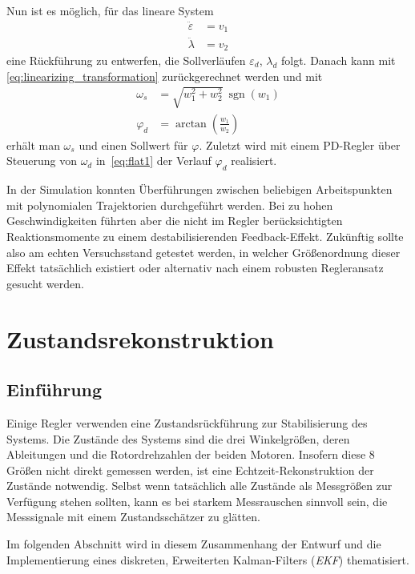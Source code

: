 \documentclass[10pt,twocolumn]{article}
\DeclareMathOperator{\sgn}{\mathrm{sgn}}
\begin{document}
	Nun ist es möglich, für das lineare System
	\begin{subequations}
		\begin{align}
		\ddot{\varepsilon} &= v_1\\
		\ddot{\lambda} &= v_2
		\end{align}
	\end{subequations}
	eine Rückführung zu entwerfen, die Sollverläufen $\varepsilon_d$, $\lambda_d$ folgt.
	Danach kann mit \ref{eq:linearizing_transformation} zurückgerechnet werden und mit
	\begin{subequations}
		\begin{align}
		\omega_s &= \sqrt{w_1^2 + w_2^2}\ \sgn (w_1)\\
		\varphi_d &= \arctan \left(\frac{w_1}{w_2}\right) 
		\end{align}
	\end{subequations}
	erhält man \(\omega_s\) und einen Sollwert für \(\varphi\).
	Zuletzt wird mit einem PD-Regler über Steuerung von \(\omega_d\) in~\ref{eq:flat1} der Verlauf \(\varphi_d\) realisiert.
	
	In der Simulation konnten Überführungen zwischen beliebigen Arbeitspunkten mit polynomialen Trajektorien durchgeführt werden.
	Bei zu hohen Geschwindigkeiten führten aber die nicht im Regler berücksichtigten Reaktionsmomente zu einem destabilisierenden Feedback-Effekt.
	Zukünftig sollte also am echten Versuchsstand getestet werden, in welcher Größenordnung dieser Effekt tatsächlich existiert oder alternativ nach einem robusten Regleransatz gesucht werden.
	
	
	\section{Zustandsrekonstruktion}
	\subsection{Einf\"uhrung}
	Einige Regler verwenden eine Zustandsr\"uckf\"uhrung zur Stabilisierung des Systems. Die Zust\"ande des Systems sind die drei Winkelgr\"oßen, deren Ableitungen und die Rotordrehzahlen der beiden Motoren. Insofern diese 8 Gr\"oßen nicht direkt gemessen werden, ist eine Echtzeit-Rekonstruktion der Zustände notwendig. 
	Selbst wenn tatsächlich alle Zustände als Messgrößen zur Verfügung stehen sollten, kann es bei starkem Messrauschen sinnvoll sein, die Messsignale mit einem Zustandsschätzer zu glätten.
	
	Im folgenden Abschnitt wird in diesem Zusammenhang der Entwurf und die Implementierung eines diskreten, Erweiterten Kalman-Filters (\textit{EKF})  thematisiert. 
\end{document}
